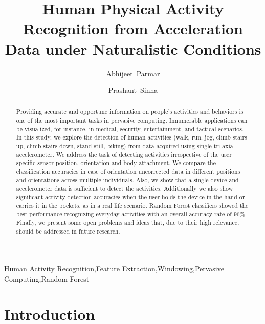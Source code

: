 \documentclass[5p]{elsarticle}
\begin{document}
\begin{frontmatter}

\title{Human Physical Activity Recognition from Acceleration Data under Naturalistic Conditions}


\author[dic]{Abhijeet~Parmar}
\address[dic]{Design Innovation Centre, University of Delhi, Delhi, India 110007}

\author[cic]{Prashant~Sinha}
\address[cic]{Cluster Innovation Centre, University of Delhi, Delhi, India 110007}

\begin{abstract}
Providing accurate and opportune information on people’s activities and behaviors is one of the most important tasks in pervasive computing. Innumerable applications can be visualized, for instance, in medical, security, entertainment, and tactical scenarios. In this study, we explore the detection of human activities (walk, run, jog, climb stairs up, climb stairs down, stand still, biking) from data acquired using single tri-axial accelerometer. We address the task of detecting activities irrespective of the user specific sensor position, orientation and body attachment. We compare the classification accuracies in case of orientation uncorrected data in different positions and orientations across multiple individuals. Also, we show that a single device and accelerometer data is sufficient to detect the activities. Additionally we also show significant activity detection accuracies when the user holds the device in the hand or carries it in the pockets, as in a real life scenario. Random Forest classifiers showed the best performance recognizing everyday activities with an overall accuracy rate of $96\%$. Finally, we present some open problems and ideas that, due to their high relevance, should be addressed in future research.
\end{abstract}

\begin{keyword}
Human Activity Recognition\sep Feature Extraction\sep Windowing\sep Pervasive Computing\sep Random Forest
\end{keyword}

\end{frontmatter}

\linenumbers

\section{Introduction}
\end{document}

